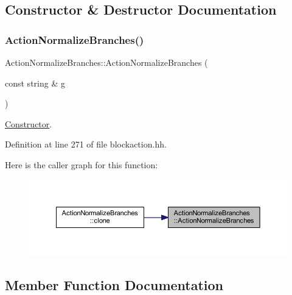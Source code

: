 \subsection{Constructor \& Destructor Documentation}
\mbox{\label{class_action_normalize_branches_a6a8cbf253362ca7659b0c6462c274d7d}} 
\subsubsection{\texorpdfstring{ActionNormalizeBranches()}{ActionNormalizeBranches()}}
{\footnotesize\ttfamily Action\+Normalize\+Branches\+::\+Action\+Normalize\+Branches (\begin{DoxyParamCaption}\item[{const string \&}]{g }\end{DoxyParamCaption})\hspace{0.3cm}{\ttfamily [inline]}}



\mbox{\hyperlink{class_constructor}{Constructor}}. 



Definition at line 271 of file blockaction.\+hh.

Here is the caller graph for this function\+:
\nopagebreak
\begin{figure}[H]
\begin{center}
\leavevmode
\includegraphics[width=350pt]{class_action_normalize_branches_a6a8cbf253362ca7659b0c6462c274d7d_icgraph}
\end{center}
\end{figure}


\subsection{Member Function Documentation}
\mbox{\label{class_action_normalize_branches_a311d3d577d32dbe0f4c3dc23b731a035}} 
